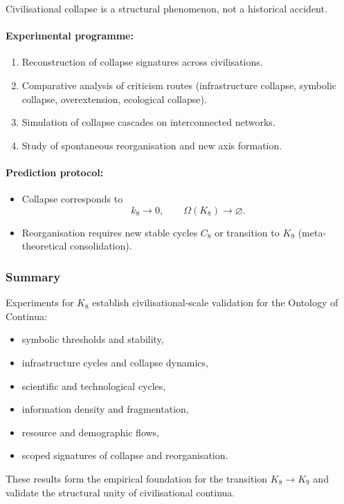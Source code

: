 Civilisational collapse is a structural phenomenon, not a historical accident.

\paragraph{Experimental programme:}

\begin{enumerate}
    \item Reconstruction of collapse signatures across civilisations.
    \item Comparative analysis of criticism routes
          (infrastructure collapse, symbolic collapse,
           overextension, ecological collapse).
    \item Simulation of collapse cascades on interconnected networks.
    \item Study of spontaneous reorganisation and new axis formation.
\end{enumerate}

\paragraph{Prediction protocol:}

\begin{itemize}
    \item Collapse corresponds to
          \[
             k_8 \rightarrow 0,\qquad \Omega(K_8) \rightarrow \varnothing.
          \]
    \item Reorganisation requires new stable cycles $C_8$
          or transition to $K_9$ (meta-theoretical consolidation).
\end{itemize}



\subsubsection{Summary}

Experiments for $K_8$ establish civilisational-scale validation for the Ontology of Continua:

\begin{itemize}
    \item symbolic thresholds and stability,
    \item infrastructure cycles and collapse dynamics,
    \item scientific and technological cycles,
    \item information density and fragmentation,
    \item resource and demographic flows,
    \item scoped signatures of collapse and reorganisation.
\end{itemize}

These results form the empirical foundation for the transition $K_8 \rightarrow K_9$
and validate the structural unity of civilisational continua.
